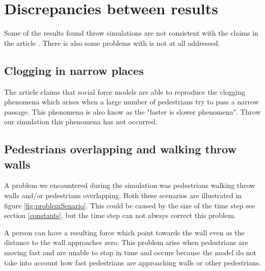 \section{Discrepancies between results}
\label{sec:discrepancies}
Some of the results found throw simulations are not consistent with the claims in the article \cite{self-org}. There is also some problems with is not at all addressed.

\subsection{Clogging in narrow places}
The article \cite{self-org} claims that social force models are able to reproduce the clogging phenomena which arises when a large number of pedestrians try to pass a narrow passage. This phenomena is also know as the "faster is slower phenomena". Throw our simulation this phenomena has not occurred.



\subsection{Pedestrians overlapping and walking throw walls}
A problem we encountered during the simulation was pedestrians walking throw walls and/or pedestrians overlapping. Both these scenarios are illustrated in figure \ref{fig:problemSenario}. This could be caused by the size of the time step see section \ref{constants}, but the time step can not always correct this problem.

A person can have a resulting force which point towards the wall even as the distance to the wall approaches zero. This problem arise when pedestrians are moving fast and are unable to stop in time and occurs because the model do not take into account how fast pedestrians are approaching walls or other pedestrians.

